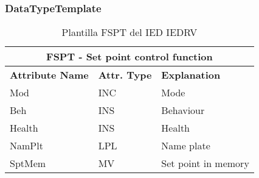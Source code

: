     
    
    \subsubsection{DataTypeTemplate}
    \begin{table}[H]
    \begin{center}
    \begin{tabular}{|l|l|p{8.5cm}|}
            \hline
            \multicolumn{3}{|c|}{\cellcolor[gray]{0.8} \textbf{ FSPT}  - Set point control function} \\
            \hline
            \textbf{Attribute Name} & \textbf{Attr. Type} & \textbf{Explanation} \\
            \hline 
            Mod & INC & Mode \\
            \hline
            Beh & INS & Behaviour \\
            \hline
            Health & INS & Health \\
            \hline
            NamPlt & LPL & Name plate \\
            \hline
            SptMem & MV & Set point in memory \\
            \hline
    \end{tabular}
    \caption{Plantilla FSPT del IED IEDRV}
    \label{table:lnTypeFSPT_1}
    \end{center}
    \end{table}
    
    
    